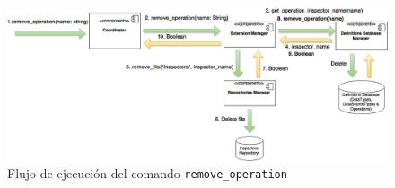 \begin{figure}[H]
    \begin{center}
        \includegraphics[width=\textwidth]{figures/remove_operation}
        \caption{Flujo de ejecución del comando \texttt{remove\_operation}}
    \end{center}
\end{figure}
